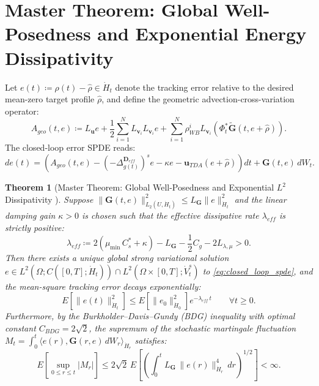 \documentclass[11pt,a4paper,reqno]{article}
\def\mathrm#1{#1}%
\def\mathcal#1{#1}%
\def\mathbb#1{#1}%
\theoremstyle{plain}
\newtheorem{theorem}{Theorem}[section]
\theoremstyle{definition}
\theoremstyle{remark}
\numberwithin{equation}{section}
\begin{document}
\section{Master Theorem: Global Well-Posedness and Exponential Energy Dissipativity}
\label{sec:master_theorem}

Let $e(t) \coloneqq \rho(t) - \hat{\rho} \in \dot{H}_t$ denote the tracking error relative to the desired mean-zero target profile $\hat{\rho}$, and define the geometric advection-cross-variation operator:
\begin{equation}\label{eq:ageo_def}
  A_{\mathrm{geo}}(t, e) \coloneqq \mathcal{L}_{\mathbf{u}} e + \frac{1}{2} \sum_{i=1}^N \mathcal{L}_{\mathbf{v}_i} \mathcal{L}_{\mathbf{v}_i} e + \sum_{i=1}^N \rho_{WB}^i \mathcal{L}_{\mathbf{v}_i} \left( \Phi_t^* \tilde{\mathbf{G}}(t, e + \hat{\rho}) \right).
\end{equation}
The closed-loop error SPDE reads:
\begin{equation}\label{eq:closed_loop_spde}
  \mathrm{d}e(t) = \left( A_{\mathrm{geo}}(t, e) - (-\Delta_{g(t)}^{\mathbf{D}_{\mathrm{eff}}})^s e - \kappa e - \mathbf{u}_{\mathrm{TDA}}(e + \hat{\rho}) \right)\mathrm{d}t + \mathbf{G}(t, e)\,\mathrm{d}\mathcal{W}_t.
\end{equation}

\begin{theorem}[Master Theorem: Global Well-Posedness and Exponential $L^2$ Dissipativity \cite{ananda2026stochastic_fluid_v2, prevot2007concise, liu2015stochastic}]\label{thm:master_stability}
Suppose $\|\mathbf{G}(t,e)\|_{L_2(U,\dot{H}_t)}^2 \le L_{\mathbf{G}}\|e\|_{\dot{H}_t}^2$ and the linear damping gain $\kappa > 0$ is chosen such that the effective dissipative rate $\lambda_{\mathrm{eff}}$ is strictly positive:
\begin{equation}\label{eq:lambda_eff}
  \lambda_{\mathrm{eff}} \coloneqq 2\left(\mu_{\min}\,\mathcal{C}_s^* + \kappa\right) - L_{\mathbf{G}} - \frac{1}{2}C_g - 2 L_{\lambda,\mu} > 0.
\end{equation}
Then there exists a unique global strong variational solution $e \in L^2(\Omega; C([0,T]; \dot{H}_t)) \cap L^2(\Omega \times [0,T]; \dot{V}_t^s)$ to \eqref{eq:closed_loop_spde}, and the mean-square tracking error decays exponentially:
\begin{equation}\label{eq:exp_decay_bound}
  \mathbb{E}\!\left[ \|e(t)\|_{\dot{H}_t}^2 \right] \le \mathbb{E}\!\left[ \|e_0\|_{\dot{H}_0}^2 \right] \mathrm{e}^{-\lambda_{\mathrm{eff}}\,t} \qquad \forall t \ge 0.
\end{equation}
Furthermore, by the Burkholder--Davis--Gundy (BDG) inequality \cite{burkholder1973distribution, davis1976optimal} with optimal constant $C_{\mathrm{BDG}} = 2\sqrt{2}$, the supremum of the stochastic martingale fluctuation $M_t = \int_0^t \langle e(r), \mathbf{G}(r,e)\,\mathrm{d}\mathcal{W}_r \rangle_{\dot{H}_r}$ satisfies:
\begin{equation}\label{eq:bdg_bound}
  \mathbb{E}\!\left[ \sup_{0 \le r \le t} |M_r| \right] \le 2\sqrt{2}\, \mathbb{E}\!\left[ \left( \int_0^t L_{\mathbf{G}}\,\|e(r)\|_{\dot{H}_r}^4 \,\mathrm{d}r \right)^{1/2} \right] < \infty.
\end{equation}
\end{theorem}
\end{document}
